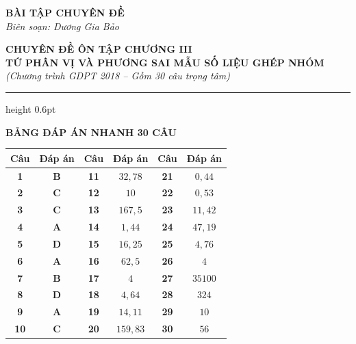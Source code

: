 \documentclass[12pt,a4paper]{article}
\begin{document}
\thispagestyle{firstpage}

\noindent
\begin{minipage}[t]{0.36\textwidth}
    \centering
    {\fontsize{12}{14}\selectfont\textbf{BÀI TẬP CHUYÊN ĐỀ}}\\[4pt]
    \textit{Biên soạn: Dương Gia Bảo}\\[6pt]
    \setlength{\fboxrule}{0.8pt}
    \setlength{\fboxsep}{5pt}
\end{minipage}\hfill
\begin{minipage}[t]{0.62\textwidth}
    \centering
    {\fontsize{13}{15}\selectfont\textbf{CHUYÊN ĐỀ ÔN TẬP CHƯƠNG III}}\\[3pt]
    {\fontsize{12}{14}\selectfont\textbf{TỨ PHÂN VỊ VÀ PHƯƠNG SAI MẪU SỐ LIỆU GHÉP NHÓM}}\\[3pt]
    {\fontsize{11}{13}\selectfont\textit{(Chương trình GDPT 2018 -- Gồm 30 câu trọng tâm)}}
\end{minipage}

\par\vspace{4pt}
\hrule height 0.6pt
\vspace{8pt}

\begin{center}
    {\fontsize{13}{15}\selectfont\textbf{BẢNG ĐÁP ÁN NHANH 30 CÂU}}
\end{center}

\begin{center}
\renewcommand{\arraystretch}{1.25}
\begin{tabular}{|c|c||c|c||c|c|}
\hline
\textbf{Câu} & \textbf{Đáp án} & \textbf{Câu} & \textbf{Đáp án} & \textbf{Câu} & \textbf{Đáp án} \\ \hline
\textbf{1} & \textbf{B} & \textbf{11} & $32{,}78$ & \textbf{21} & $0{,}44$ \\ \hline
\textbf{2} & \textbf{C} & \textbf{12} & $10$ & \textbf{22} & $0{,}53$ \\ \hline
\textbf{3} & \textbf{C} & \textbf{13} & $167{,}5$ & \textbf{23} & $11{,}42$ \\ \hline
\textbf{4} & \textbf{A} & \textbf{14} & $1{,}44$ & \textbf{24} & $47{,}19$ \\ \hline
\textbf{5} & \textbf{D} & \textbf{15} & $16{,}25$ & \textbf{25} & $4{,}76$ \\ \hline
\textbf{6} & \textbf{A} & \textbf{16} & $62{,}5$ & \textbf{26} & $4$ \\ \hline
\textbf{7} & \textbf{B} & \textbf{17} & $4$ & \textbf{27} & $35100$ \\ \hline
\textbf{8} & \textbf{D} & \textbf{18} & $4{,}64$ & \textbf{28} & $324$ \\ \hline
\textbf{9} & \textbf{A} & \textbf{19} & $14{,}11$ & \textbf{29} & $10$ \\ \hline
\textbf{10} & \textbf{C} & \textbf{20} & $159{,}83$ & \textbf{30} & $56$ \\ \hline
\end{tabular}
\end{center}
\end{document}
